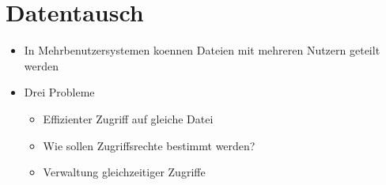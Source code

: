 \documentclass[a4paper]{scrreprt}
\begin{document}
\section{Datentausch}
\begin{itemize}
	\item In Mehrbenutzersystemen koennen Dateien mit mehreren Nutzern geteilt werden
	\item Drei Probleme
		\begin{itemize}
			\item Effizienter Zugriff auf gleiche Datei
			\item Wie sollen Zugriffsrechte bestimmt werden?
			\item Verwaltung gleichzeitiger Zugriffe
		\end{itemize}
\end{itemize}
\end{document}
